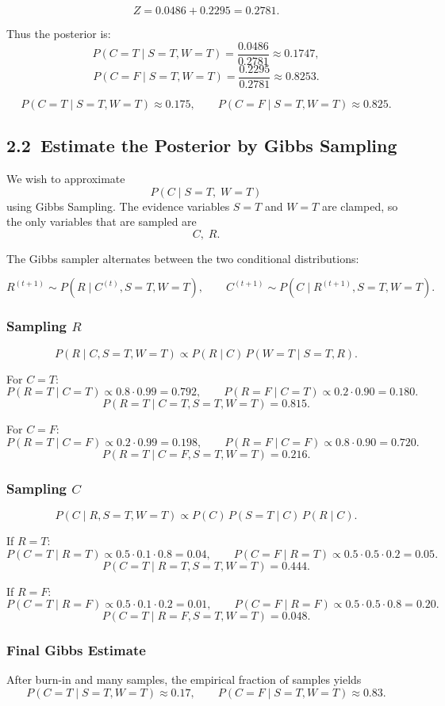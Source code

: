 \documentclass{article}
\begin{document}
\[
Z = 0.0486 + 0.2295 = 0.2781.
\]

Thus the posterior is:
\[
P(C=T \mid S=T,W=T)
= \frac{0.0486}{0.2781}
\approx 0.1747,
\]
\[
P(C=F \mid S=T,W=T)
= \frac{0.2295}{0.2781}
\approx 0.8253.
\]

\[
\boxed{
P(C=T \mid S=T, W=T) \approx 0.175, \qquad
P(C=F \mid S=T, W=T) \approx 0.825.
}
\]

\subsection*{2.2\ Estimate the Posterior by Gibbs Sampling}

We wish to approximate
\[
P(C \mid S=T,\; W=T)
\]
using Gibbs Sampling. The evidence variables \(S=T\) and \(W=T\) are clamped, so the only variables that are sampled are
\[
C,\; R.
\]

The Gibbs sampler alternates between the two conditional distributions:

\[
R^{(t+1)} \sim P(R \mid C^{(t)}, S=T, W=T),
\qquad
C^{(t+1)} \sim P(C \mid R^{(t+1)}, S=T, W=T).
\]

\subsubsection*{Sampling \(R\)}
\[
P(R \mid C, S=T, W=T)
\propto P(R\mid C)\,P(W=T \mid S=T, R).
\]

For \(C=T\):
\[
P(R=T\mid C=T) \propto 0.8 \cdot 0.99 = 0.792,
\qquad
P(R=F\mid C=T) \propto 0.2 \cdot 0.90 = 0.180.
\]
\[
P(R=T\mid C=T,S=T,W=T) = 0.815.
\]

For \(C=F\):
\[
P(R=T\mid C=F) \propto 0.2 \cdot 0.99 = 0.198,
\qquad
P(R=F\mid C=F) \propto 0.8 \cdot 0.90 = 0.720.
\]
\[
P(R=T\mid C=F,S=T,W=T) = 0.216.
\]

\subsubsection*{Sampling \(C\)}
\[
P(C \mid R, S=T, W=T)
\propto P(C)\,P(S=T\mid C)\,P(R\mid C).
\]

If \(R=T\):
\[
P(C=T\mid R=T) \propto 0.5 \cdot 0.1 \cdot 0.8 = 0.04,
\qquad
P(C=F\mid R=T) \propto 0.5 \cdot 0.5 \cdot 0.2 = 0.05.
\]
\[
P(C=T\mid R=T,S=T,W=T) = 0.444.
\]

If \(R=F\):
\[
P(C=T\mid R=F) \propto 0.5 \cdot 0.1 \cdot 0.2 = 0.01,
\qquad
P(C=F\mid R=F) \propto 0.5 \cdot 0.5 \cdot 0.8 = 0.20.
\]
\[
P(C=T\mid R=F,S=T,W=T) = 0.048.
\]

\subsubsection*{Final Gibbs Estimate}
After burn-in and many samples, the empirical fraction of samples yields
\[
P(C=T \mid S=T,W=T) \approx 0.17,
\qquad
P(C=F \mid S=T,W=T) \approx 0.83.
\]
\end{document}
